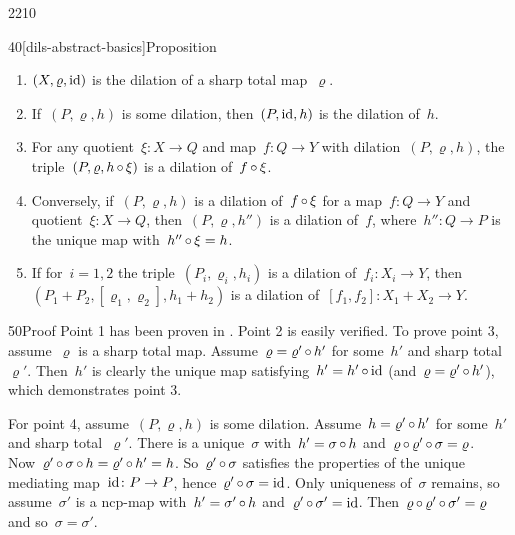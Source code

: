 \begin{parsec}{2210}
\begin{point}{40}[dils-abstract-basics]{Proposition}
\begin{enumerate}
\item
    $(X, \varrho, \mathrm{id})$ is the dilation
        of a sharp total map~$\varrho$.

\item
    If~$(P, \varrho, h)$ is some dilation,
        then~$(P, \mathrm{id}, h)$ is the dilation of~$h$.

\item
    For any quotient~$\xi \colon X \to Q$
            and map~$f\colon Q \to Y$
            with dilation~$(P, \varrho, h)$,
            the triple~$(P, \varrho, h \mathop{\circ} \xi)$
            is a dilation of~$f \mathop{\circ} \xi$.

\item
    Conversely, if~$(P, \varrho, h)$
            is a dilation of~$f \mathop{\circ} \xi$
            for a map~$f\colon Q \to Y$
            and quotient~$\xi \colon X \to Q$,
        then~$(P, \varrho, h'')$ is a dilation of~$f$,
        where~$h''\colon Q \to P$ is the unique map with~$h'' \mathop{\circ} \xi = h$.

\item
    If for~$i=1,2$ the triple~$(P_i, \varrho_i, h_i)$
            is a dilation of~$f_i \colon X_i \to Y$,
    then~$(P_1 + P_2, [\varrho_1,\varrho_2], h_1 + h_2)$
        is a dilation of~$[f_1, f_2] \colon X_1 + X_2 \to Y$.
\end{enumerate}
\spacingfix{}
\begin{point}{50}{Proof}%
Point 1 has been proven in .
Point 2 is easily verified.
To prove point 3, assume~$\varrho$ is a sharp total map.
Assume~$\varrho = \varrho' \mathop{\circ} h'$ for some~$h'$ and sharp total~$\varrho'$.
Then~$h'$ is clearly the unique map
    satisfying~$h' = h' \mathop{\circ} \mathrm{id}$ (and~$\varrho = \varrho' \mathop{\circ} h'$),
    which demonstrates point 3.

For point 4, assume~$(P, \varrho, h)$ is some dilation.
Assume~$h = \varrho' \mathop{\circ} h'$ for some~$h'$ and sharp total~$\varrho'$.
There is a unique~$\sigma$ with~$h' = \sigma \mathop{\circ} h$
    and~$\varrho\mathop{\circ} \varrho' \mathop{\circ} \sigma = \varrho$.
Now~$\varrho' \mathop{\circ} \sigma \mathop{\circ} h = \varrho' \mathop{\circ} h' = h$.
    So~$\varrho' \mathop{\circ} \sigma$
        satisfies the properties of the unique mediating map~$\mathrm{id}\colon P \to P$,
        hence~$\varrho' \mathop{\circ} \sigma = \mathrm{id}$.
Only uniqueness of~$\sigma$ remains,
    so assume~$\sigma'$ is a ncp-map with~$h'  = \sigma' \mathop{\circ} h$
    and~$\varrho' \mathop{\circ} \sigma' = \mathrm{id}$.
Then~$\varrho \mathop{\circ} \varrho' \mathop{\circ} \sigma' = \varrho$
    and so~$\sigma = \sigma'$.


\end{point}
\end{point}
\end{parsec}
